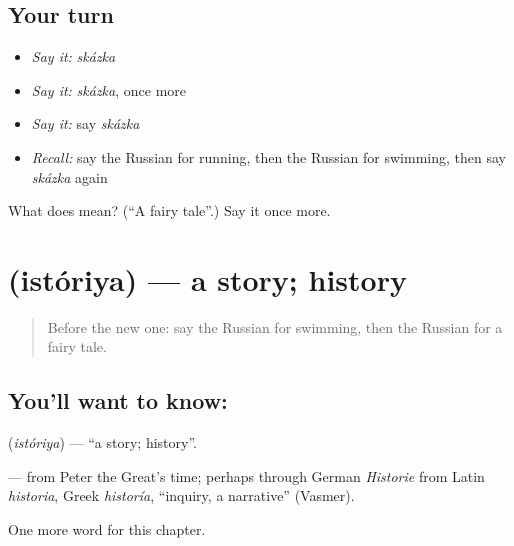 \subsection*{Your turn}
\begin{itemize}
\raggedright
  \item \emph{Say it:} \emph{skázka}
  \item \emph{Say it:} \emph{skázka}, once more
  \item \emph{Say it:} say \emph{skázka}
  \item \emph{Recall:} say the Russian for running, then the Russian for swimming, then say \emph{skázka} again
\end{itemize}

\begin{tcolorbox}[breakable,colback=teal!4,colframe=teal!35!black,title={Before you move on}]
What does  mean? (\textquotedblleft{}A fairy tale\textquotedblright{}.) Say it once more.
\end{tcolorbox}
\section[\texorpdfstring{\ru{история} (istóriya)}{история (istóriya)}]{ (istóriya) — a story; history}

\label{lesson:RU-C253-istoriya}



\begin{quote}
Before the new one: say the Russian for swimming, then the Russian for a fairy tale.
\end{quote}

\subsection*{You'll want to know: }
\textbf{} (\emph{istóriya}) — \textquotedblleft{}a story; history\textquotedblright{}.

\begin{cousinweb}
\textbf{} — from Peter the Great's time; perhaps through German \emph{Historie} from Latin \emph{historia}, Greek \emph{historía}, \textquotedblleft{}inquiry, a narrative\textquotedblright{} (Vasmer).
\end{cousinweb}

\begin{grammarlens}[title={What you've built}]
One more word for this chapter.
\end{grammarlens}

